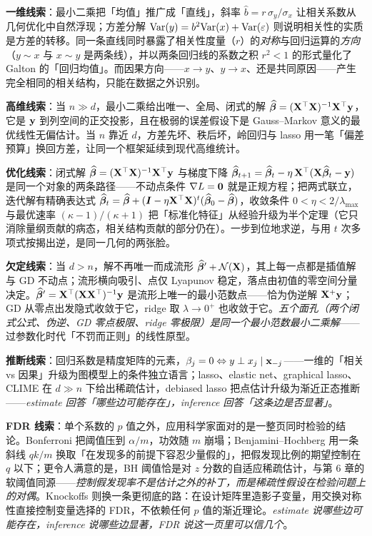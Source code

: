 \textbf{一维线索}：最小二乘把「均值」推广成「直线」，斜率 $\hat{b} = r\,\sigma_y/\sigma_x$ 让相关系数从几何优化中自然浮现；方差分解 $\mathrm{Var}(y) = b^2\mathrm{Var}(x) + \mathrm{Var}(\varepsilon)$ 则说明相关性的实质是方差的转移。同一条直线同时暴露了相关性度量（$r$）的\textit{对称}与回归运算的\textit{方向}（$y \sim x$ 与 $x \sim y$ 是两条线），并以两条回归线的系数之积 $r^2 < 1$ 的形式量化了 Galton 的「回归均值」。而因果方向——$x \to y$、$y \to x$、还是共同原因——产生完全相同的相关结构，只能在数据之外识别\cite{wright1921,reichenbach1956}。

\textbf{高维线索}：当 $n \gg d$，最小二乘给出唯一、全局、闭式的解 $\widehat{\bm{\beta}} = (\mathbf{X}^\top\mathbf{X})^{-1}\mathbf{X}^\top\mathbf{y}$，它是 $\mathbf{y}$ 到列空间的正交投影，且在极弱的误差假设下是 Gauss--Markov 意义的最优线性无偏估计\cite{gauss1823}。当 $n$ 靠近 $d$，方差先坏、秩后坏，岭回归与 lasso 用一笔「偏差预算」换回方差，让同一个框架延续到现代高维统计\cite{hoerl1970,tibshirani1996}。

\textbf{优化线索}：闭式解 $\widehat{\bm{\beta}} = (\mathbf{X}^\top\mathbf{X})^{-1}\mathbf{X}^\top\mathbf{y}$ 与梯度下降 $\widehat{\bm{\beta}}_{t+1} = \widehat{\bm{\beta}}_t - \eta\,\mathbf{X}^\top(\mathbf{X}\widehat{\bm{\beta}}_t - \mathbf{y})$ 是同一个对象的两条路径——不动点条件 $\nabla L = \mathbf{0}$ 就是正规方程；把两式联立，迭代解有精确表达式 $\widehat{\bm{\beta}}_t = \widehat{\bm{\beta}} + (\bm{I} - \eta\mathbf{X}^\top\mathbf{X})^t(\widehat{\bm{\beta}}_0 - \widehat{\bm{\beta}})$，收敛条件 $0 < \eta < 2/\lambda_{\max}$ 与最优速率 $(\kappa-1)/(\kappa+1)$ 把「标准化特征」从经验升级为半个定理（它只消除量纲贡献的病态，相关结构贡献的部分仍在）。一步到位地求逆，与用 $t$ 次多项式按揭出逆，是同一几何的两张脸。

\textbf{欠定线索}：当 $d > n$，解不再唯一而成流形 $\widehat{\bm{\beta}}' + \mathcal{N}(\mathbf{X})$，其上每一点都是插值解与 GD 不动点；流形横向吸引、点仅 Lyapunov 稳定，落点由初值的零空间分量决定。$\widehat{\bm{\beta}}' = \mathbf{X}^\top(\mathbf{X}\mathbf{X}^\top)^{-1}\mathbf{y}$ 是流形上唯一的最小范数点——恰为伪逆解 $\mathbf{X}^+\mathbf{y}$；GD 从零点出发隐式收敛于它，ridge 取 $\lambda \to 0^+$ 也收敛于它。\textit{五个面孔（两个闭式公式、伪逆、GD 零点极限、ridge 零极限）是同一个最小范数最小二乘解}——过参数化时代「不罚而正则」的线性原型。

\textbf{推断线索}：回归系数是精度矩阵的元素，$\beta_j = 0 \Leftrightarrow y \perp x_j \mid \mathbf{x}_{-j}$——一维的「相关 vs 因果」升级为图模型上的条件独立语言\cite{lauritzen1996}；lasso、elastic net、graphical lasso、CLIME 在 $d \gg n$ 下给出稀疏估计，debiased lasso 把点估计升级为渐近正态推断——\textit{estimate 回答「哪些边可能存在」，inference 回答「这条边是否显著」}\cite{meinshausen2006,zou2005,friedman2008,cai2011,zhang2014,vandegeer2014}。

\textbf{FDR 线索}：单个系数的 $p$ 值之外，应用科学家面对的是一整页同时检验的结论。Bonferroni 把阈值压到 $\alpha/m$，功效随 $m$ 崩塌；Benjamini--Hochberg 用一条斜线 $qk/m$ 换取「在发现多的前提下容忍少量假的」，把假发现比例的期望控制在 $q$ 以下\cite{benjamini1995}；更令人满意的是，BH 阈值恰是对 $z$ 分数的自适应稀疏估计，与第 6 章的软阈值同源——\textit{控制假发现率不是估计之外的补丁，而是稀疏性假设在检验问题上的对偶}\cite{abramovich2006}。Knockoffs 则换一条更彻底的路：在设计矩阵里造影子变量，用交换对称性直接控制变量选择的 FDR，不依赖任何 $p$ 值的渐近理论\cite{barber2015}。\textit{estimate 说哪些边可能存在，inference 说哪些边显著，FDR 说这一页里可以信几个}。

